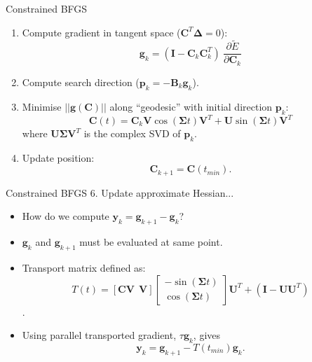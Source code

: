 \documentclass{beamer}
\def\hE{\tilde{E}}
\begin{document}
\begin{frame}{Constrained BFGS}
\begin{enumerate}
\item<1->{Compute gradient in tangent space ($\mathbf{C}^T \mathbf{\Delta} = 0$):
$$\mathbf{g}_k = (\mathbf{I} - \mathbf{C}_k \mathbf{C}_k^T)\ \frac{\partial \hE}{\partial \mathbf{C}_k}$$}
\item<1->{Compute search direction ($\mathbf{p}_k = - \mathbf{B}_k \mathbf{g}_k$).}
\item<1->{Minimise $||\mathbf{g}(\mathbf{C})||$ along ``geodesic'' with initial direction $\mathbf{p}_k$:
$$\mathbf{C}(t) = \mathbf{C}_k \mathbf{V} \cos(\mathbf{\Sigma} t)\mathbf{V}^T + \mathbf{U} \sin(\mathbf{\Sigma} t) \mathbf{V}^T$$
where $\mathbf{U \Sigma V}^T$ is the complex SVD of $\mathbf{p}_k$.}
\item<1->{Update position:
$$\mathbf{C}_{k+1} = \mathbf{C}(t_{min}).$$}
\end{enumerate}
\end{frame}

\begin{frame}{Constrained BFGS}
6. Update approximate Hessian...
\begin{itemize}
\item<1->{How do we compute $\mathbf{y}_k = \mathbf{g}_{k+1} - \mathbf{g}_{k}$?}
\item<1->{$\mathbf{g}_{k}$ and $\mathbf{g}_{k+1}$ must be evaluated at \alert{same point}.} 

\item<2->{Transport matrix defined as:
$$T(t) = \left[\mathbf{C} \mathbf{V}\ \ \mathbf{V} \right] \left[
 \begin{matrix}
 -\sin(\mathbf{\Sigma} t)\\
  \cos(\mathbf{\Sigma} t)
  \end{matrix} \right] \mathbf{U}^T + (\mathbf{I} - \mathbf{U} \mathbf{U}^T)$$.}
\item<2->{Using parallel transported gradient, $\tau \mathbf{g}_k$, gives $$\mathbf{y}_k = \mathbf{g}_{k+1} - T(t_{min})\mathbf{g}_{k}.$$
  } 
 \end{itemize}
\end{frame}
\end{document}
